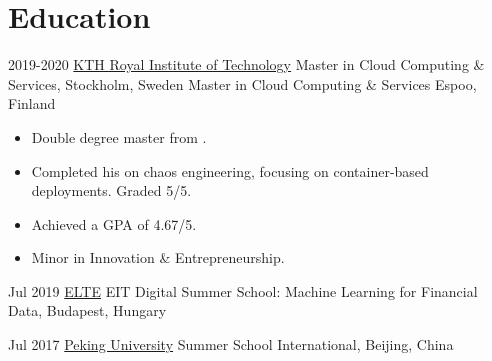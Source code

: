 \section{Education}{
     \customcventry
     {2019-2020}
     {\color{blue}\href{https://kth.se/en}{KTH Royal Institute of Technology}}
     {Master in Cloud Computing \& Services,}
     {Stockholm, Sweden}
     {}{}{} %
     {\color{white}Master in Cloud Computing \& Services}
     {Espoo, Finland}{}{}
     {
     	\begin{itemize}[leftmargin=0.6cm, label={\textbullet}]
     		\item Double degree master from .
     		\item Completed his  on chaos engineering, focusing on container-based deployments. Graded 5/5.
     		\item Achieved a GPA of 4.67/5.
     		\item Minor in Innovation \& Entrepreneurship.
     	\end{itemize}
     }
     
     \customcventry
     {Jul 2019}
     {\color{blue}\href{https://www.elte.hu/en/}{ELTE}}
     {EIT Digital Summer School: Machine Learning for Financial Data,}
     {Budapest, Hungary}
     {}{}
     {
    \vspace{2mm} %
     }
    
      \customcventry
     {Jul 2017}
     {\color{blue}\href{http://www.oir.pku.edu.cn/summerschool/}{Peking University}}
     {Summer School International,}
     {Beijing, China}
     {}{}
     {
     }
     
}
